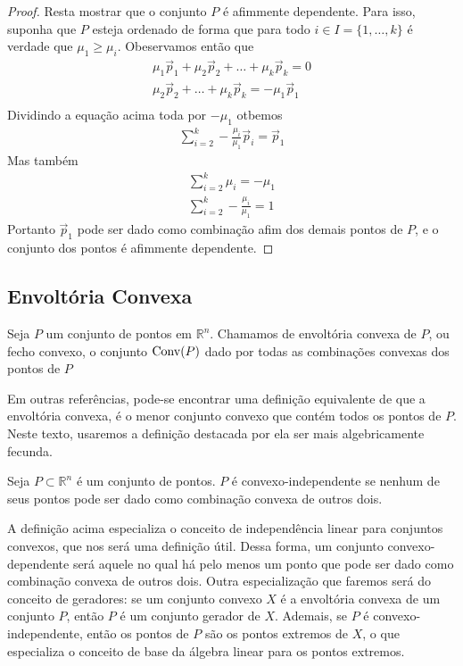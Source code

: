 \begin{lemma:afim}
\begin{proof}
		Resta mostrar que o conjunto $P$ é afimmente dependente. Para isso, suponha
		que $P$ esteja ordenado de forma que para todo $i \in I = \{1, \ldots, k\}$
		é verdade que $\mu_1 \geq \mu_i$. Obeservamos então que
	  \begin{gather*}
	    \mu_1 \vec p_1 + \mu_2 \vec p_2 + \ldots + \mu_k \vec p_k = 0 \\
        \mu_2 \vec p_2 + \ldots + \mu_k \vec p_k = - \mu_1 \vec p_1 \\
	  \end{gather*}
	  Dividindo a equação acima toda por $-\mu_1$ otbemos
	  \begin{gather*}
	    \sum_{i=2}^{k} -\frac{\mu_i}{\mu_1} \vec p_i = \vec p_1
	  \end{gather*}
	  Mas também
	  \begin{gather*}
        \sum_{i=2}^{k} \mu_i = -\mu_1 \\
	    \sum_{i=2}^{k} -\frac{\mu_i}{\mu_1} = 1
	  \end{gather*}
	  Portanto $\vec p_1$ pode ser dado como combinação afim dos demais pontos de
	  $P$, e o conjunto dos pontos é afimmente dependente.
	\end{proof}
\end{lemma:afim}

\subsection{Envoltória Convexa}

\begin{def:convex hull}
	\label{def:convex hull}
	Seja $P$ um conjunto de pontos em $\mathbb{R}^n$. Chamamos de envoltória
	convexa de $P$, ou fecho convexo, o conjunto
	$\mathrm{Conv}(P)$ dado por todas as combinações convexas dos pontos de $P$
\end{def:convex hull}

Em outras referências, pode-se encontrar uma definição equivalente de que a
envoltória convexa, é o menor conjunto convexo que contém todos os pontos de $P$.
Neste texto, usaremos a definição destacada por ela ser mais algebricamente fecunda.

\begin{def:independencia convexa}
	Seja $P \subset \mathbb{R}^n$ é um conjunto de pontos. $P$ é convexo-independente
	se nenhum de seus pontos pode ser dado como combinação convexa de outros dois.
\end{def:independencia convexa}

A definição acima especializa o conceito de independência linear para conjuntos convexos,
que nos será uma definição útil. Dessa forma, um conjunto convexo-dependente será aquele
no qual há pelo menos um ponto que pode ser dado como combinação convexa de outros dois.
Outra especialização que faremos será do conceito de geradores: se um conjunto convexo
$X$ é a envoltória convexa de um conjunto $P$, então $P$ é um conjunto gerador de $X$.
Ademais, se $P$ é convexo-independente, então os pontos de $P$ são os pontos extremos
de $X$, o que especializa o conceito de base da álgebra linear para os pontos extremos.

